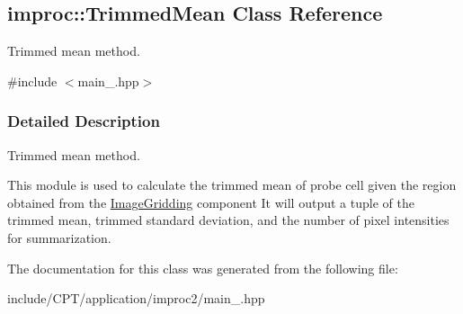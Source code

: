 \hypertarget{classimproc_1_1_trimmed_mean}{\subsection{improc\-:\-:Trimmed\-Mean Class Reference}
\label{classimproc_1_1_trimmed_mean}
}


Trimmed mean method.  




{\ttfamily \#include $<$main\-\_\-.\-hpp$>$}



\subsubsection{Detailed Description}
Trimmed mean method. 

This module is used to calculate the trimmed mean of probe cell given the region obtained from the \hyperlink{classimproc_1_1_image_gridding}{Image\-Gridding} component It will output a tuple of the trimmed mean, trimmed standard deviation, and the number of pixel intensities for summarization. 

The documentation for this class was generated from the following file\-:\begin{DoxyCompactItemize}
\item 
include/\-C\-P\-T/application/improc2/main\-\_\-.\-hpp\end{DoxyCompactItemize}

